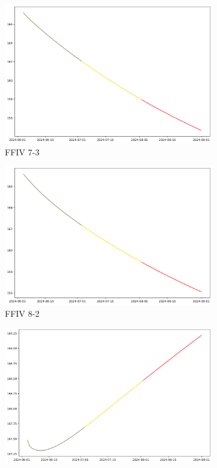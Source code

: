 \documentclass{ieeeojies}
\begin{document}
\begin{figure}[H]
    \centering
    \begin{subfigure}[b]{0.33\linewidth}
        \centering
        \includegraphics[width=\linewidth]{GRU Plot/GRU_FFIV_7_3_90days.png}
        \caption{FFIV 7-3}
        \label{fig:ffiv-7-3}
    \end{subfigure}%
    \hfill
    \begin{subfigure}[b]{0.33\linewidth}
        \centering
        \includegraphics[width=\linewidth]{GRU Plot/GRU_FFIV_8_2_90days.png}
        \caption{FFIV 8-2}
        \label{fig:ffiv-8-2}
    \end{subfigure}%
    \hfill
    \begin{subfigure}[b]{0.33\linewidth}
        \centering
        \includegraphics[width=\linewidth]{GRU Plot/GRU_FFIV_75_25_90days.png}

\end{subfigure}
\end{figure}
\end{document}
